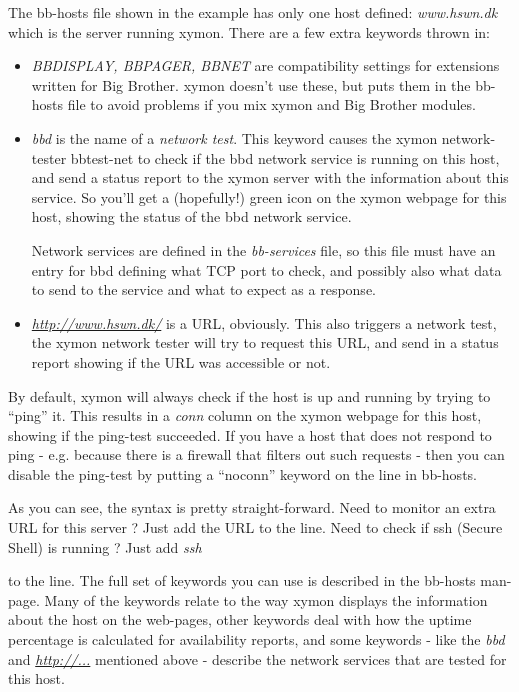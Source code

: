  The bb-hosts file shown in the example has only one host defined: \emph{www.hswn.dk}
 which is the server running xymon. There are a few extra keywords thrown in:

\begin{itemize}
\item \emph{BBDISPLAY, BBPAGER, BBNET} are compatibility settings for
  extensions written for Big Brother. xymon doesn't use these, but
  puts them in the bb-hosts file to avoid problems if you mix xymon
  and Big Brother modules.

\item \emph{bbd}
 is the name of a \emph{network test}. This keyword causes the xymon
 network-tester bbtest-net to check if the bbd network service is
 running on this host, and send a status report to the xymon server
 with the information about this service. So you'll get a (hopefully!)
 green icon on the xymon webpage for this host, showing the status of
 the bbd network service. 

 Network services are defined in the \emph{bb-services} file, so this
 file must have an entry for bbd defining what TCP port to check, and
 possibly also what data to send to the service and what to expect as
 a response.

\item \emph{\url{http://www.hswn.dk/}}
 is a URL, obviously. This also triggers a network test, the xymon
 network tester will try to request this URL, and send in a status
 report showing if the URL was accessible or not.


\end{itemize}


 By default, xymon will always check if the host is up and running by
 trying to ``ping'' it. This results in a \emph{conn} column on the
 xymon webpage for this host, showing if the ping-test succeeded. If
 you have a host that does not respond to ping - e.g. because there is
 a firewall that filters out such requests - then you can disable the
 ping-test by putting a ``noconn'' keyword on the line in bb-hosts.



 As you can see, the syntax is pretty straight-forward. Need to
 monitor an extra URL for this server ? Just add the URL to the
 line. Need to check if ssh (Secure Shell) is running ? Just add
 \emph{ssh}

 to the line. The full set of keywords you can use is described in the
 bb-hosts man-page. Many of the keywords relate to the way xymon
 displays the information about the host on the web-pages, other
 keywords deal with how the uptime percentage is calculated for
 availability reports, and some keywords - like the \emph{bbd} and
 \emph{\url{http://...}} mentioned above - describe the network
 services that are tested for this host.

